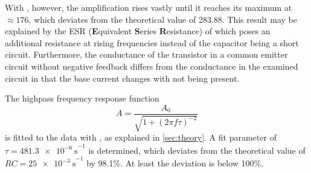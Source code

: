 With , however, the amplification rises vastly until it reaches its maximum at $\approx\num{176}$, which deviates from the theoretical value of \num{283.88}.
This result may be explained by the ESR (\textbf{E}quivalent \textbf{S}eries \textbf{R}esistance) of  which poses an additional resistance at rising frequencies instead of the capacitor being a short circuit.
Furthermore, the conductance of the transistor in a common emitter circuit without negative feedback differs from the conductance in the examined circuit in that the base current changes with  not being present.

The highpass frequency response function
\begin{equation*}
	A=\frac{A_0}{\sqrt{1 + (2\pi f\tau)^{-2}}}
\end{equation*}
is fitted to the data with , as explained in \autoref{sec:theory}.
A fit parameter of $\tau=\SI{481.3e-6}{\second}^{-1}$ is determined, which deviates from the theoretical value of $RC=\SI{25e-3}{\second}^{-1}$ by \num{98.1}\%.
At least the deviation is below 100\%.
 
